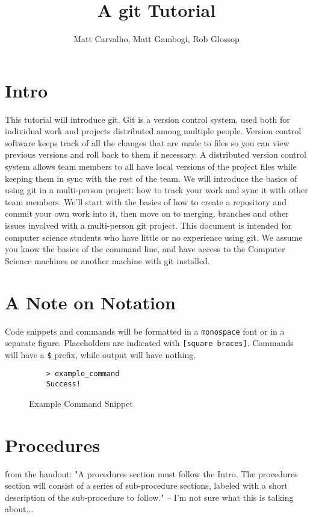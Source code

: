 \documentclass[11pt]{report}
\title{A git Tutorial}
\author{Matt Carvalho, Matt Gambogi, Rob Glossop}
\begin{document}
\thispagestyle{empty}
\maketitle

\clearpage {} 

\tableofcontents

\listoffigures

\clearpage {}
\section{Intro}
This tutorial will introduce git.  Git is a version control system,
used both for individual work and projects distributed among multiple
people.  Version control software keeps track of all the changes that
are made to files so you can view previous versions and roll back to
them if necessary.  A distributed version control system allows team
members to all have local versions of the project files while keeping
them in sync with the rest of the team. We will introduce the basics
of using git in a multi-person project: how to track your work and
sync it with other team members. We'll start with the basics of how to
create a repository and commit your own work into it, then move on to
merging, branches and other issues involved with a multi-person git
project. This document is intended for computer science students who
have little or no experience using git. We assume you know the basics
of the command line, and have access to the Computer Science machines
or another machine with git installed.

\section{A Note on Notation}
Code snippets and commands will be formatted in a \texttt{monospace} font or in
a separate figure. Placeholders are indicated with \texttt{[square
    braces]}. Commands will have a \texttt{\$} prefix, while output
will have nothing.
\begin{figure}[h]
  \caption{Example Command Snippet}
  \begin{lstlisting}
    > example_command
    Success!
  \end{lstlisting}
\end{figure}

\section{Procedures}
from the handout: "A procedures section must follow the Intro. The
procedures section will consist of a series of sub-procedure sections,
labeled with a short description of the sub-procedure to follow." --
I'm not sure what this is talking about...
\end{document}
